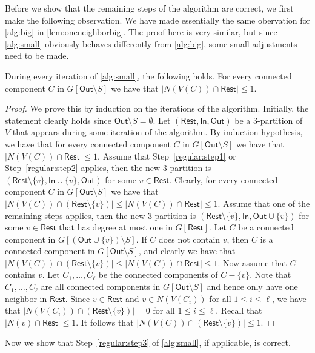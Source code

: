 \documentclass[a4paper,UKenglish,cleveref, autoref, thm-restate, numberwithinsect]{lipics-v2021}
\newcounter{algorithm}
\newcommand{\In}{\mathsf{In}}
\newcommand{\Out}{\mathsf{Out}}
\newcommand{\Rest}{\mathsf{Rest}}
\begin{document}
Before we show that the remaining steps of the algorithm are correct, we first make the following observation. We have made essentially the same obervation for \cref{alg:big} in \cref{lem:oneneighborbig}. The proof here is very similar, but since \cref{alg:small} obviously behaves differently from \cref{alg:big}, some small adjustments need to be made.
\begin{lemma}\label{lem:oneneighbor}
During every iteration of \cref{alg:small}, the following holds. For every connected component $C$ in $G[\Out\setminus S]$ we have that $|N(V(C))\cap \Rest|\le 1$.
\end{lemma}
\begin{proof}
We prove this by induction on the iterations of the algorithm. Initially, the statement clearly holds since $\Out\setminus S=\emptyset$. Let $(\Rest,\In,\Out)$ be a 3-partition of $V$ that appears during some iteration of the algorithm. By induction hypothesis, we have that for every connected component $C$ in $G[\Out\setminus S]$ we have that $|N(V(C))\cap \Rest|\le 1$.
Assume that Step~\ref{regular:step1} or Step~\ref{regular:step2} applies, then the new 3-partition is $(\Rest\setminus \{v\},\In\cup\{v\},\Out)$ for some $v\in \Rest$. Clearly, for every connected component $C$ in $G[\Out\setminus S]$ we have that $|N(V(C))\cap (\Rest\setminus\{v\})|\le |N(V(C))\cap \Rest|\le 1$.
Assume that one of the remaining steps applies, then the new 3-partition is $(\Rest\setminus \{v\},\In,\Out\cup\{v\})$ for some $v\in \Rest$ that has degree at most one in $G[\Rest]$. Let $C$ be a connected component in $G[(\Out\cup\{v\})\setminus S]$. If $C$ does not contain $v$, then $C$ is a connected component in $G[\Out\setminus S]$, and clearly we have that $|N(V(C))\cap (\Rest\setminus\{v\})|\le |N(V(C))\cap \Rest|\le 1$. Now assume that $C$ contains $v$. Let $C_1,\ldots,C_\ell$ be the connected components of $C-\{v\}$. Note that $C_1,\ldots,C_\ell$ are all connected components in $G[\Out\setminus S]$ and hence only have one neighbor in $\Rest$. Since $v\in\Rest$ and $v\in N(V(C_i))$ for all $1\le i\le \ell$, we have that $|N(V(C_i))\cap (\Rest\setminus\{v\})|=0$ for all $1\le i\le \ell$. Recall that $|N(v)\cap\Rest|\le 1$. It follows that $|N(V(C))\cap (\Rest\setminus\{v\})|\le 1$. 
\end{proof}

Now we show that Step~\ref{regular:step3} of \cref{alg:small}, if applicable, is correct.
\end{document}
